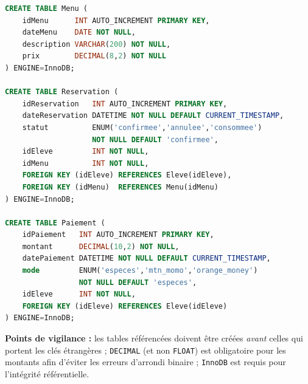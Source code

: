 \documentclass[11pt]{article}
\begin{document}
\begin{corrige}
\begin{lstlisting}[language=SQL]
CREATE TABLE Menu (
    idMenu      INT AUTO_INCREMENT PRIMARY KEY,
    dateMenu    DATE NOT NULL,
    description VARCHAR(200) NOT NULL,
    prix        DECIMAL(8,2) NOT NULL
) ENGINE=InnoDB;

CREATE TABLE Reservation (
    idReservation   INT AUTO_INCREMENT PRIMARY KEY,
    dateReservation DATETIME NOT NULL DEFAULT CURRENT_TIMESTAMP,
    statut          ENUM('confirmee','annulee','consommee')
                    NOT NULL DEFAULT 'confirmee',
    idEleve         INT NOT NULL,
    idMenu          INT NOT NULL,
    FOREIGN KEY (idEleve) REFERENCES Eleve(idEleve),
    FOREIGN KEY (idMenu)  REFERENCES Menu(idMenu)
) ENGINE=InnoDB;

CREATE TABLE Paiement (
    idPaiement   INT AUTO_INCREMENT PRIMARY KEY,
    montant      DECIMAL(10,2) NOT NULL,
    datePaiement DATETIME NOT NULL DEFAULT CURRENT_TIMESTAMP,
    mode         ENUM('especes','mtn_momo','orange_money')
                 NOT NULL DEFAULT 'especes',
    idEleve      INT NOT NULL,
    FOREIGN KEY (idEleve) REFERENCES Eleve(idEleve)
) ENGINE=InnoDB;
\end{lstlisting}
\textbf{Points de vigilance :} les tables référencées doivent être créées \emph{avant} celles qui portent les clés étrangères ; \texttt{DECIMAL} (et non \texttt{FLOAT}) est obligatoire pour les montants afin d'éviter les erreurs d'arrondi binaire ; \texttt{InnoDB} est requis pour l'intégrité référentielle.
\end{corrige}
\end{document}
